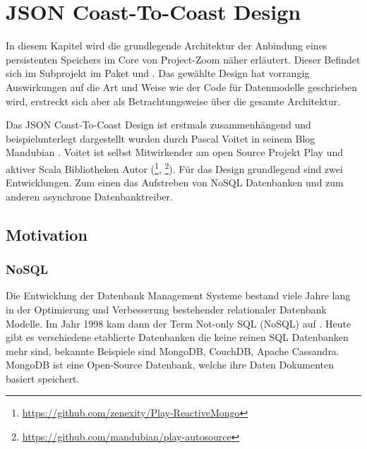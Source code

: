 \chapter{JSON Coast-To-Coast Design}
In diesem Kapitel wird die grundlegende Architektur der Anbindung eines persistenten Speichers im Core von Project-Zoom näher erläutert. Dieser Befindet sich im  Subprojekt im Paket  und . Das gewählte Design hat vorrangig Auswirkungen auf die Art und Weise wie der Code für Datenmodelle geschrieben wird, erstreckt sich aber als Betrachtungsweise über die gesamte Architektur.

Das JSON Coast-To-Coast Design ist erstmals zusammenhängend und beispielunterlegt dargestellt wurden durch Pascal Voitet in seinem Blog Mandubian \cite{jctc}. Voitet ist selbst Mitwirkender am open Source Projekt Play und aktiver Scala Bibliotheken Autor (\footnote{\url{ https://github.com/zenexity/Play-ReactiveMongo}}, \footnote{\url{ https://github.com/mandubian/play-autosource}}). Für das Design grundlegend sind zwei Entwicklungen. Zum einen das Aufstreben von NoSQL Datenbanken und zum anderen asynchrone Datenbanktreiber.

\section{Motivation}

\subsection{NoSQL}
Die Entwicklung der Datenbank Management Systeme bestand viele Jahre lang in der Optimierung und Verbesserung bestehender relationaler Datenbank Modelle. Im Jahr 1998 kam dann der Term Not-only SQL (NoSQL) auf \cite{storage-solutions}. Heute gibt es verschiedene etablierte Datenbanken die keine reinen SQL Datenbanken mehr sind, bekannte Beispiele sind MongoDB, CouchDB, Apache Cassandra. MongoDB ist eine Open-Source Datenbank, welche ihre Daten Dokumenten basiert speichert.

